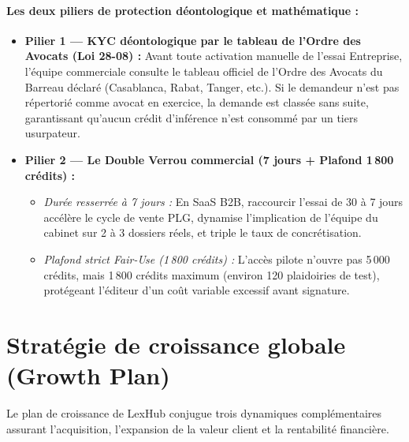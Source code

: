 \paragraph{Les deux piliers de protection déontologique et mathématique :}
\begin{itemize}[leftmargin=*]
  \item \textbf{Pilier 1 --- KYC déontologique par le tableau de l'Ordre des Avocats (Loi 28-08) :} Avant toute activation manuelle de l'essai Entreprise, l'équipe commerciale consulte le tableau officiel de l'Ordre des Avocats du Barreau déclaré (Casablanca, Rabat, Tanger, etc.). Si le demandeur n'est pas répertorié comme avocat en exercice, la demande est classée sans suite, garantissant qu'aucun crédit d'inférence n'est consommé par un tiers usurpateur.
  \item \textbf{Pilier 2 --- Le Double Verrou commercial (7 jours + Plafond 1\,800 crédits) :}
    \begin{itemize}[leftmargin=1.2em]
      \item \emph{Durée resserrée à 7 jours :} En SaaS B2B, raccourcir l'essai de 30 à 7 jours accélère le cycle de vente PLG, dynamise l'implication de l'équipe du cabinet sur 2 à 3 dossiers réels, et triple le taux de concrétisation.
      \item \emph{Plafond strict Fair-Use (1\,800 crédits) :} L'accès pilote n'ouvre pas 5\,000 crédits, mais 1\,800 crédits maximum (environ 120 plaidoiries de test), protégeant l'éditeur d'un coût variable excessif avant signature.
    \end{itemize}
\end{itemize}

\section{Stratégie de croissance globale (Growth Plan)}
\label{sec:growth-plan}

Le plan de croissance de LexHub conjugue trois dynamiques complémentaires assurant l'acquisition, l'expansion de la valeur client et la rentabilité financière.

